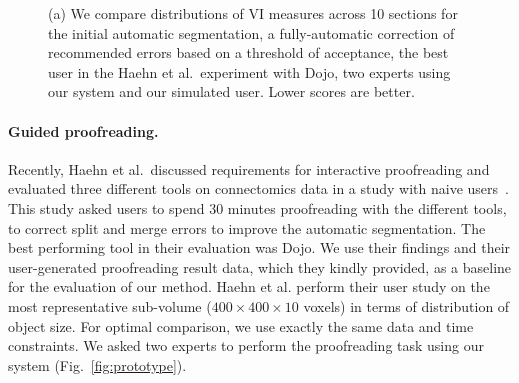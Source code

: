 \begin{figure}[t]
 \centering
    \hfill

\caption{(a) We compare distributions of VI measures across 10 sections for the initial automatic segmentation, a fully-automatic correction of recommended errors based on a threshold of acceptance, the best user in the Haehn et al.~experiment with Dojo, two experts using our system and our simulated user. Lower scores are better.}
\label{fig:results}

\end{figure}

\paragraph{Guided proofreading.}
Recently, Haehn et al.~discussed requirements for interactive proofreading and evaluated three different tools on connectomics data in a study with naive users~\cite{haehn_dojo_2014}. This study asked users to spend 30 minutes proofreading with the different tools, to correct split and merge errors to improve the automatic segmentation. The best performing tool in their evaluation was Dojo. We use their findings and their user-generated proofreading result data, which they kindly provided, as a baseline for the evaluation of our method.
Haehn et al. perform their user study on the most representative sub-volume ($400\times400\times10$ voxels) in terms of distribution of object size. For optimal comparison, we use exactly the same data and time constraints. We asked two experts to perform the proofreading task using our system (Fig.~\ref{fig:prototype}).

